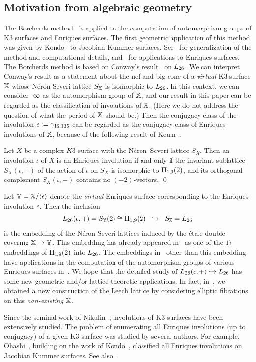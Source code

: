 \documentclass{amsart} %
\begin{document}
\subsection{Motivation from algebraic geometry}\label{subsec:alggeom}
%
The Borcherds method~\cite{MR913200, MR1654763}
is applied to the computation of automorphism groups of K3 surfaces and Enriques surfaces.
The first geometric application of this method was given 
by Kondo~\cite{MR1618132} to Jacobian Kummer surfaces.
See~\cite{MR3456710, MR4759604} for generalization of the method and computational details,
and~\cite{MR4498439, MR4389670} for applications to Enriques surfaces.
The Borcherds method is based on Conway's result~\cite{MR690711} on $L_{26}$. 
We can interpret Conway's result 
as a statement about the nef-and-big cone of a \emph{virtual} K3 surface $\mathord{\mathbb{X}}$
 whose N\'eron-Severi lattice $S_{\mathord{\mathbb{X}}}$ is isomorphic to $L_{26}$.
In this context, we can consider $\cdot \infty$ as 
the automorphism group of $\mathord{\mathbb{X}}$,
and our result in this paper can be regarded as the classification of involutions of $\mathord{\mathbb{X}}$.
(Here we do not address the question of what the period of $\mathord{\mathbb{X}}$  should be.)
Then 
the conjugacy class of the involution $\epsilon:=\gamma_{16, 135}$ can be regarded 
 as the conjugacy class of Enriques involutions of $\mathord{\mathbb{X}}$,
 because of the following result of Keum~\cite{MR1060704}.
 \begin{proposition}
 Let $X$ be a complex $K3$ surface
with the N\'eron--Severi lattice $S_X$.
 Then an involution $\iota$ of $X$ is an Enriques involution
 if and only if the invariant sublattice $S_X(\iota, +)$ of 
 the action of $\iota$ on $S_X$ 
 is isomorphic to $\mathrm{II}_{1,9} (2)$,
 and its orthogonal complement $S_X(\iota, -)$
contains no $(-2)$-vectors.
 \qed
 \end{proposition}
%
Let $\mathord{\mathbb{Y}}=\mathord{\mathbb{X}}/\langle {\epsilon} \rangle$ denote the \emph{virtual} Enriques surface
corresponding to the Enriques involution $\epsilon$.
Then the inclusion 
\[
L_{26}(\epsilon, +)=S_{\mathord{\mathbb{Y}}}(2)\cong \mathrm{II}_{1,9} (2)\;\; \hookrightarrow \;\;S_{\mathord{\mathbb{X}}}=L_{26}
\]
is the embedding of the N\'eron-Severi lattices
induced by the \'etale double covering $\mathord{\mathbb{X}}\to \mathord{\mathbb{Y}}$.
This embedding 
has already appeared in~\cite{MR4389670} as one of the $17$ embeddings 
of $\mathrm{II}_{1,9} (2)$ into $L_{26}$.
The embeddings in~\cite{MR4389670} other than this embedding 
have applications in the computation of the automorphism groups
of various Enriques surfaces in~\cite{MR4498439}.
We hope that the detailed study of $L_{26}(\epsilon, +)\hookrightarrow L_{26}$
has some new geometric and/or lattice theoretic applications.
In fact,
in~\cite{MR4674939}, 
we obtained a new construction of the Leech lattice
by considering elliptic fibrations on this \emph{non-existing} $\mathord{\mathbb{X}}$.
%
\par
Since the seminal work of Nikulin~\cite{MR633160}, 
involutions of K3 surfaces have been extensively studied.
The problem of enumerating all Enriques involutions 
(up to conjugacy) of a given K3 surface was
studied by several authors.
For example, Ohashi~\cite{MR2552959},
building on the work of Kondo~\cite{MR1618132}, 
 classified all Enriques involutions on Jacobian Kummer surfaces. 
 See also~\cite{MR4288644}.
%
%
\end{document}
